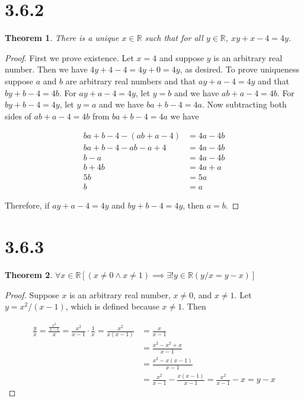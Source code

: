 \documentclass{article}
\newtheorem*{theorem}{Theorem}  %
\begin{document}
\section*{3.6.2}
\begin{theorem} There is a unique $x \in \mathbb{R}$ such that for all $y \in \mathbb{R}$, $xy + x - 4 = 4y$.
\end{theorem}
\begin{proof}
First we prove existence. Let $x = 4$ and suppose $y$ is an arbitrary real number. Then we have $4y + 4 - 4 = 4y + 0 = 4y$, as desired. To prove uniqueness suppose $a$ and $b$ are arbitrary real numbers and that $ay + a - 4 = 4y$ and that $by + b - 4 = 4b$. For $ay + a - 4 = 4y$, let $y = b$ and we have $ab + a - 4 = 4b$. For $by + b - 4 = 4y$, let $y = a$ and we have $ba + b - 4 = 4a$. Now subtracting both sides of $ab + a - 4 = 4b$ from $ba + b - 4 = 4a$ we have

\begin{align*}
ba + b - 4 - (ab + a - 4) &= 4a - 4b \\
ba + b - 4 - ab - a + 4 &= 4a - 4b \\
b - a &= 4a - 4b \\
b + 4b &= 4a + a \\
5b &= 5a \\
b &= a
\end{align*}

Therefore, if $ay + a - 4 = 4y$ and $by + b - 4 = 4y$, then $a = b$.

\end{proof}

\section*{3.6.3}
\begin{theorem} $\forall x \in \mathbb{R} [ (x \neq 0 \land x \neq 1) \implies \exists! y \in \mathbb{R} (y/x = y - x) ]$
\end{theorem}
\begin{proof}
Suppose $x$ is an arbitrary real number, $x \neq 0$, and $x \neq 1$. Let $y = x^2/(x-1)$, which is defined because $x \neq 1$. Then

\begin{align*}
\frac{y}{x} = \frac{\frac{x^2}{x-1}}{x} = \frac{x^2}{x-1} \cdot \frac{1}{x} = \frac{x^2}{x(x-1)} &= \frac{x}{x-1} \\
&= \frac{x^2 - x^2 + x}{x-1} \\
&= \frac{x^2 - x(x-1)}{x-1} \\
& = \frac{x^2}{x-1} - \frac{x(x-1)}{x-1} = \frac{x^2}{x-1} - x = y - x
\end{align*}
\end{proof}
\end{document}

